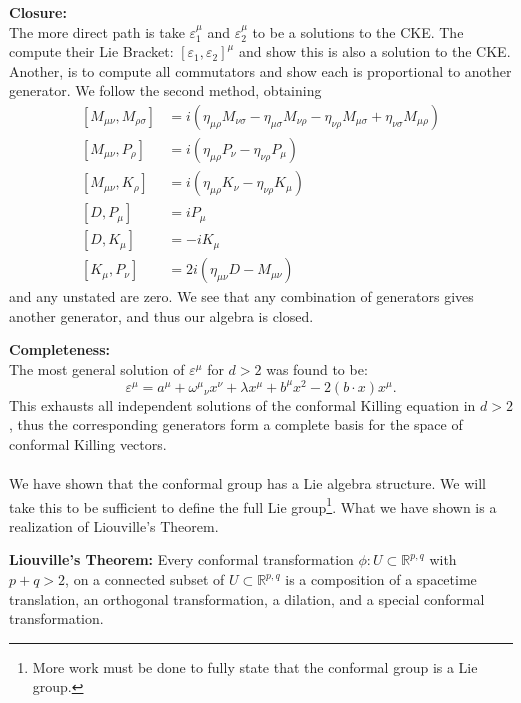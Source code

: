 \documentclass{article}
\begin{document}
\textbf{Closure:} \\
The more direct path is take $\varepsilon^\mu_1$ and $\varepsilon^\mu_2$ to be a solutions to the CKE. The compute their Lie Bracket: $[\varepsilon_1 , \varepsilon_2]^\mu$ and show this is also a solution to the CKE. Another, is to compute all commutators and show each is proportional to another generator. We follow the second method, obtaining
\begin{equation}
\begin{aligned}
[M_{\mu\nu}, M_{\rho\sigma}]
&= i(\eta_{\mu\rho} M_{\nu\sigma}-\eta_{\mu\sigma} M_{\nu\rho}
-\eta_{\nu\rho} M_{\mu\sigma}+\eta_{\nu\sigma} M_{\mu\rho}) \\
[M_{\mu\nu}, P_\rho]
&= i(\eta_{\mu\rho} P_\nu-\eta_{\nu\rho} P_\mu) \\
[M_{\mu\nu}, K_\rho]
&= i(\eta_{\mu\rho} K_\nu-\eta_{\nu\rho} K_\mu) \\
[D, P_\mu]
&= iP_\mu \\
[D, K_\mu] &= -iK_\mu \\
[K_\mu, P_\nu]
&= 2i(\eta_{\mu\nu} D - M_{\mu\nu})
\end{aligned}
\label{com_rel_c}
\end{equation}
and any unstated are zero. We see that any combination of generators gives another generator, and thus our algebra is closed. 

\textbf{Completeness:}\\
The most general solution of $\varepsilon^\mu$ for $d>2$ was found to be:
\begin{equation}
    \varepsilon^\mu = a^\mu + \omega^\mu{}_\nu x^\nu + \lambda x^\mu + b^\mu x^2 - 2(b\cdot x)x^\mu.
\end{equation}
This exhausts all independent solutions of the conformal Killing equation in $d > 2$, thus the corresponding generators form a complete basis for the space of conformal Killing vectors.\\\\
We have shown that the conformal group has a Lie algebra structure. We will take this to be sufficient to define the full Lie group\footnote{More work must be done to fully state that the conformal group is a Lie group.}. What we have shown is a realization of Liouville's Theorem. 

\textbf{Liouville's Theorem:} Every conformal transformation $\phi : U \subset \mathds{R}^{p,q}$ with $p+q >2$, on a connected subset of $U \subset \mathds{R}^{p,q}$ is a composition of a spacetime translation, an orthogonal transformation, a dilation, and a special conformal transformation. 
\end{document}
